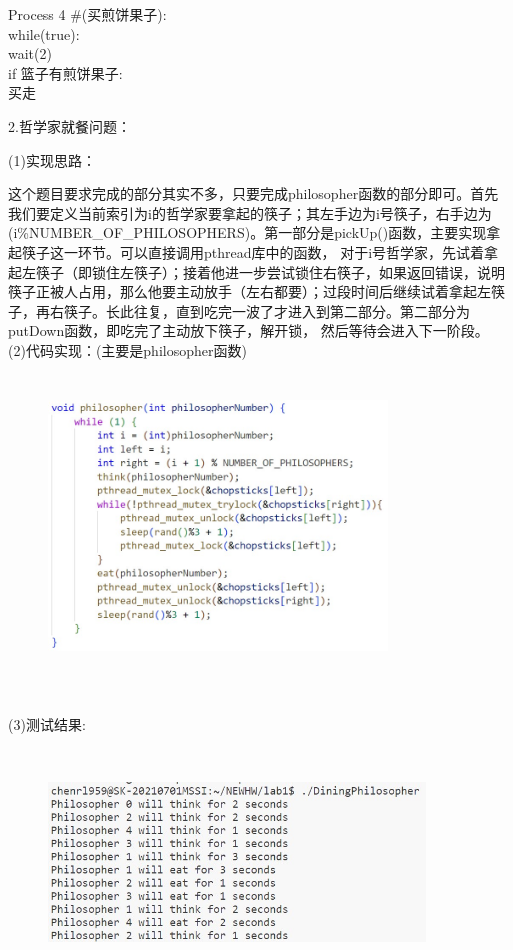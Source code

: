 \documentclass[12pt]{article}
\begin{document}
\noindent Process 4 \#(买煎饼果子):\\
\hspace*{2em}while(true):\\
\hspace*{4em}wait(2)\\
\hspace*{4em}if 篮子有煎饼果子:\\
\hspace*{6em}买走\\

\begin{large}
    \noindent 2.哲学家就餐问题：\\
\end{large}
\noindent (1)实现思路：\par
这个题目要求完成的部分其实不多，只要完成philosopher函数的部分即可。首先我们要定义当前索引为i的哲学家要拿起的筷子；其左手边为i号筷子，右手边为(i\%NUMBER\_OF\_PHILOSOPHERS)。第一部分是pickUp()函数，主要实现拿起筷子这一环节。可以直接调用pthread库中的函数，
对于i号哲学家，先试着拿起左筷子（即锁住左筷子）；接着他进一步尝试锁住右筷子，如果返回错误，说明筷子正被人占用，那么他要主动放手（左右都要）；过段时间后继续试着拿起左筷子，再右筷子。长此往复，直到吃完一波了才进入到第二部分。第二部分为putDown函数，即吃完了主动放下筷子，解开锁，
然后等待会进入下一阶段。\\
(2)代码实现：(主要是philosopher函数)
\begin{figure}[h]
    \centering
    \includegraphics[width=9cm,height=8cm]{lab1-7.jpg}
\end{figure}\\
(3)测试结果:
\begin{figure}[h]
    \centering
    \includegraphics[width=10cm,height=6cm]{lab1-8.jpg}
\end{figure}\\
\end{document}
